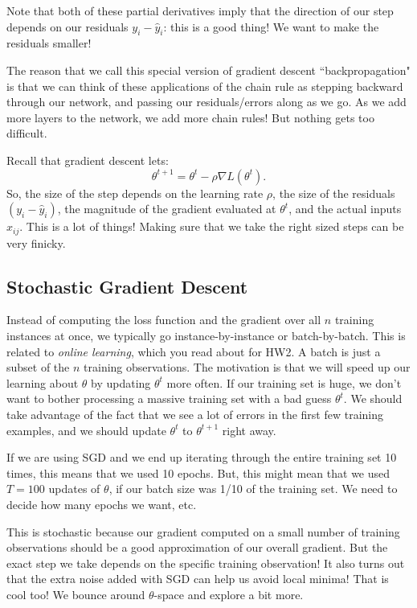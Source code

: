 Note that both of these partial derivatives imply that the direction of our step depends on our residuals $y_i - \hat{y}_i$: this is a good thing! We want to make the residuals smaller! 

The reason that we call this special version of gradient descent ``backpropagation" is that we can think of these applications of the chain rule as stepping backward through our network, and passing our residuals/errors along as we go. As we add more layers to the network, we add more chain rules! But nothing gets too difficult. 

Recall that gradient descent lets:
$$
\theta^{t+1} = \theta^t - \rho \nabla L (\theta^{t}).
$$
So, the size of the step depends on the learning rate $\rho$, the size of the residuals $(y_i - \hat{y}_i)$, the magnitude of the gradient evaluated at $\theta^{t}$, and the actual inputs $x_{ij}$. This is a lot of things! Making sure that we take the right sized steps can be very finicky. 

\subsection{Stochastic Gradient Descent}

Instead of computing the loss function and the gradient over all $n$ training instances at once, we typically go instance-by-instance or batch-by-batch. This is related to \emph{online learning}, which you read about for HW2. A batch is just a subset of the $n$ training observations. The motivation is that we will speed up our learning about $\theta$ by updating $\theta^{t}$ more often. If our training set is huge, we don't want to bother processing a massive training set with a bad guess $\theta^{t}$. We should take advantage of the fact that we see a lot of errors in the first few training examples, and we should update $\theta^{t}$ to $\theta^{t+1}$ right away. 

If we are using SGD and we end up iterating through the entire training set 10 times, this means that we used 10 epochs. But, this might mean that we used $T=100$ updates of $\theta$, if our batch size was 1/10 of the training set. We need to decide how many epochs we want, etc. 

This is stochastic because our gradient computed on a small number of training observations should be a good approximation of our overall gradient. But the exact step we take depends on the specific training observation! It also turns out that the extra noise added with SGD can help us avoid local minima! That is cool too! We bounce around $\theta$-space and explore a bit more. 

